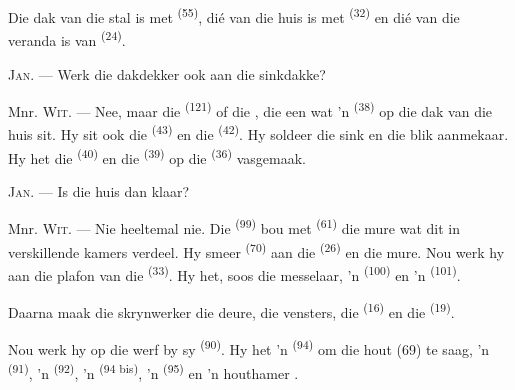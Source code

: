 
Die dak van die stal is met  \textsuperscript{(55)}, dié van die
huis is met  \textsuperscript{(32)} en dié van die veranda is van
 \textsuperscript{(24)}.

\textsc{Jan}. --- Werk die dakdekker ook aan die sinkdakke?

Mnr. \textsc{Wit}. --- Nee, maar die  \textsuperscript{(121)} of die
, die een wat 'n  \textsuperscript{(38)} op die
dak van die huis sit. Hy sit ook die  \textsuperscript{(43)} en die
 \textsuperscript{(42)}. Hy soldeer die sink en die blik aanmekaar. Hy
het die  \textsuperscript{(40)} en die 
\textsuperscript{(39)} op die  \textsuperscript{(36)} vasgemaak.

\textsc{Jan}. --- Is die huis dan klaar?

\VUsaut{3.0mm}
\VUsaut{3.0mm}

Mnr. \textsc{Wit}. --- Nie heeltemal nie. Die 
\textsuperscript{(99)} bou met  \textsuperscript{(61)} die mure wat dit
in verskillende kamers verdeel. Hy smeer  \textsuperscript{(70)} aan die
 \textsuperscript{(26)} en die mure. Nou werk hy
aan die plafon van die  \textsuperscript{(33)}. Hy het, soos die
messelaar, 'n  \textsuperscript{(100)} en 'n 
\textsuperscript{(101)}.

Daarna maak die skrynwerker die deure, die vensters, die 
\textsuperscript{(16)} en die  \textsuperscript{(19)}.

Nou werk hy op die werf by sy  \textsuperscript{(90)}. Hy het 'n
 \textsuperscript{(94)} om die hout (69) te saag, 'n 
\textsuperscript{(91)}, 'n  \textsuperscript{(92)}, 'n 
\textsuperscript{(94 bis)}, 'n  \textsuperscript{(95)} en 'n houthamer
.

